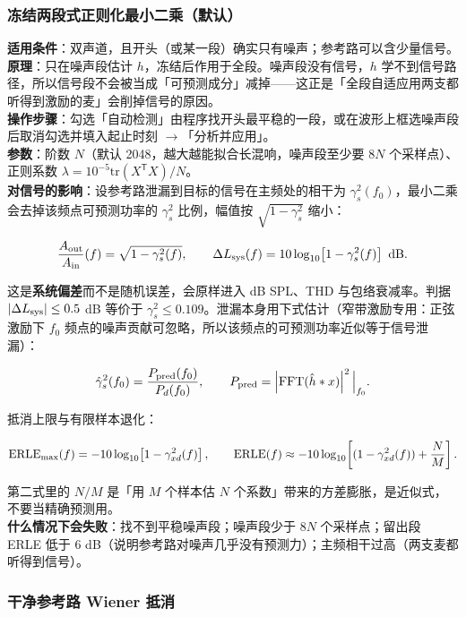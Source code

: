 \documentclass[UTF8,a4paper,12pt,scheme=chinese]{ctexart}
\begin{document}
\subsubsection{冻结两段式正则化最小二乘（默认）}

\textbf{适用条件}：双声道，且开头（或某一段）确实只有噪声；参考路可以含少量信号。\\
\textbf{原理}：只在噪声段估计 $h$，冻结后作用于全段。噪声段没有信号，$h$ 学不到信号路径，所以信号段不会被当成「可预测成分」减掉——这正是「全段自适应用两支都听得到激励的麦」会削掉信号的原因。\\
\textbf{操作步骤}：勾选「自动检测」由程序找开头最平稳的一段，或在波形上框选噪声段后取消勾选并填入起止时刻 $\rightarrow$「分析并应用」。\\
\textbf{参数}：阶数 $N$（默认 2048，越大越能拟合长混响，噪声段至少要 $8N$ 个采样点）、正则系数 $\lambda=10^{-5}\mathrm{tr}(X^{\mathsf T}X)/N$。\\
\textbf{对信号的影响}：设参考路泄漏到目标的信号在主频处的相干为 $\gamma_s^2(f_0)$，最小二乘会去掉该频点可预测功率的 $\gamma_s^2$ 比例，幅值按 $\sqrt{1-\gamma_s^2}$ 缩小：

\[
\frac{A_{\rm out}}{A_{\rm in}}(f)=\sqrt{1-\gamma_s^{2}(f)},
\qquad
\Delta L_{\rm sys}(f)=10\log_{10}\!\left[1-\gamma_s^{2}(f)\right]\ {\rm dB}.
\]

这是\textbf{系统偏差}而不是随机误差，会原样进入 dB SPL、THD 与包络衰减率。判据 $|\Delta L_{\rm sys}|\le 0.5$ dB 等价于 $\gamma_s^2\le 0.109$。泄漏本身用下式估计（窄带激励专用：正弦激励下 $f_0$ 频点的噪声贡献可忽略，所以该频点的可预测功率近似等于信号泄漏）：

\[
\hat\gamma_s^{2}(f_0)=\frac{P_{\rm pred}(f_0)}{P_d(f_0)},
\qquad
P_{\rm pred}=\left|{\rm FFT}(\hat h * x)\right|^{2}\Big|_{f_0}.
\]

抵消上限与有限样本退化：

\[
{\rm ERLE}_{\max}(f)=-10\log_{10}\!\left[1-\gamma_{xd}^{2}(f)\right],
\qquad
{\rm ERLE}(f)\approx-10\log_{10}\!\left[(1-\gamma_{xd}^{2}(f))+\frac{N}{M}\right].
\]

第二式里的 $N/M$ 是「用 $M$ 个样本估 $N$ 个系数」带来的方差膨胀，是近似式，不要当精确预测用。\\
\textbf{什么情况下会失败}：找不到平稳噪声段；噪声段少于 $8N$ 个采样点；留出段 ERLE 低于 6 dB（说明参考路对噪声几乎没有预测力）；主频相干过高（两支麦都听得到信号）。

\subsubsection{干净参考路 Wiener 抵消}
\end{document}
